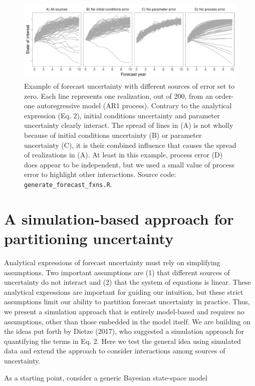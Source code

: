 \documentclass[12pt,]{article}
\begin{document}
\begin{figure}
\centering
\includegraphics{../figures/forecast_uncertainty_example.pdf}
\caption{Example of forecast uncertainty with different sources of error
set to zero. Each line represents one realization, out of 200, from an
order-one autoregressive model (AR1 process). Contrary to the analytical
expression (Eq. 2), initial conditions uncertainty and parameter
uncertainty clearly interact. The spread of lines in (A) is not wholly
because of initial conditions uncertainty (B) or parameter uncertainty
(C), it is their combined influence that causes the spread of
realizations in (A). At least in this example, process error (D) does
appear to be independent, but we used a small value of process error to
highlight other interactions. Source code:
\texttt{generate\_forecast\_fxns.R}.}
\end{figure}

\section{A simulation-based approach for partitioning
uncertainty}\label{a-simulation-based-approach-for-partitioning-uncertainty}

Analytical expressions of forecast uncertainty must rely on simplifying
assumptions. Two important assumptions are (1) that different sources of
uncertainty do not interact and (2) that the system of equations is
linear. These analytical expressions are important for guiding our
intuition, but these strict assumptions limit our ability to partition
forecast uncertainty in practice. Thus, we present a simulation approach
that is entirely model-based and requires no assumptions, other than
those embedded in the model itself. We are building on the ideas put
forth by Dietze (2017), who suggested a simulation approach for
quantifying the terms in Eq. 2. Here we test the general idea using
simulated data and extend the approach to consider interactions among
sources of uncertainty.

As a starting point, consider a generic Bayesian state-space model
\end{document}
